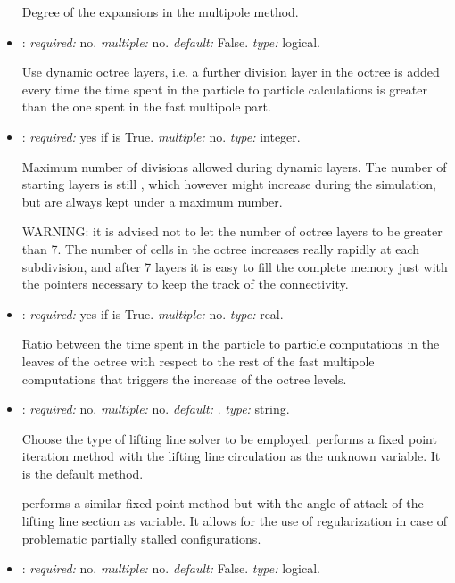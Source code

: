 \begin{itemize}
Degree of the expansions in the multipole method. 

\item {}: \textit{required:} no. \textit{multiple:} no. 
\textit{default:} False. \textit{type:} logical.

Use dynamic octree layers, i.e. a further division layer in the octree 
is added every time the time spent in the particle to particle calculations 
is greater than the one spent in the fast multipole part.

\item {}: \textit{required:} yes if  is True. 
\textit{multiple:} no. \textit{type:} integer.

Maximum number of divisions allowed during dynamic layers. The number of starting 
layers is still , which however might increase during the 
simulation, but are always kept under a maximum number. 

WARNING: it is advised not to let the number of octree layers to be greater than 7. 
The number of cells in the octree increases really rapidly at each subdivision, 
and after 7 layers it is easy to fill the complete memory just with the pointers 
necessary to keep the track of the connectivity. 

\item {}: \textit{required:} yes if  is True. 
\textit{multiple:} no. \textit{type:} real.

Ratio between the time spent in the particle to particle computations in the 
leaves of the octree with respect to the rest of the fast multipole computations 
that triggers the increase of the octree levels.

\item {}: \textit{required:} no. \textit{multiple:} no. 
\textit{default:} . \textit{type:} string.

Choose the type of lifting line solver to be employed. 
 performs a fixed point iteration method with the lifting 
line circulation as the unknown variable. It is the default method. 

 performs a similar fixed point method but with the angle 
of attack of the lifting line section as variable. 
It allows for the use of regularization in case of problematic 
partially stalled configurations. 

\item {}: \textit{required:} no. 
\textit{multiple:} no. \textit{default:} False. \textit{type:} logical.


\end{itemize}
